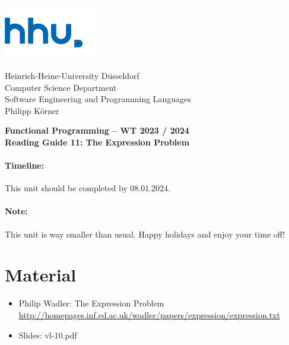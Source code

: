 \documentclass[11pt,a4paper]{article}
\begin{document}
\begin{minipage}[b]{\textwidth}
	\parbox[t]{5cm}{%
		\includegraphics[width=4cm]{unilogo}
		\hfill
	}
	\parbox[b]{11cm}{%
		Heinrich-Heine-University D\"usseldorf\\
		Computer Science Department\\
		Software Engineering and Programming Languages\\
		Philipp K\"orner
	}
\end{minipage}
\begin{center}
	\bf
	Functional Programming -- WT 2023 / 2024\\
	Reading Guide 11: The Expression Problem
\end{center}

\pagestyle{empty}

\paragraph{Timeline:} This unit should be completed by 08.01.2024.

\paragraph{Note:} This unit is way smaller than usual. Happy holidays and enjoy your time off!

\section{Material} 

\begin{itemize}
\item Philip Wadler: The Expression Problem \url{http://homepages.inf.ed.ac.uk/wadler/papers/expression/expression.txt}
\item Slides: vl-10.pdf 
\end{itemize}
\end{document}
